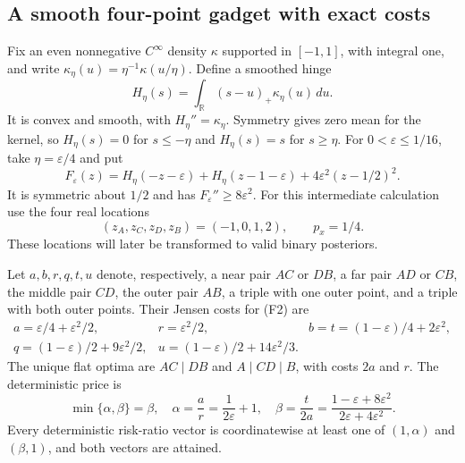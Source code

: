 \subsection{A smooth four-point gadget with exact costs}

Fix an even nonnegative $C^\infty$ density $\kappa$ supported in
$[-1,1]$, with integral one, and write
$\kappa_\eta(u)=\eta^{-1}\kappa(u/\eta)$.  Define a smoothed hinge
\[
 H_\eta(s)=\int_{\mathbb R}(s-u)_+\kappa_\eta(u)\,du.
\]
It is convex and smooth, with $H_\eta''=\kappa_\eta$.
Symmetry gives zero mean for the kernel, so
$H_\eta(s)=0$ for $s\leq-\eta$ and $H_\eta(s)=s$ for $s\geq\eta$.
For $0<\varepsilon\leq1/16$, take $\eta=\varepsilon/4$ and put
\[
 F_\varepsilon(z)
 =H_\eta(-z-\varepsilon)
  +H_\eta(z-1-\varepsilon)
  +4\varepsilon^2(z-1/2)^2.
 \tag{F2}\label{eq:hinge-gadget}
\]
It is symmetric about $1/2$ and has $F_\varepsilon''\geq8\varepsilon^2$.
For this intermediate calculation use the four real locations
\[
 (z_A,z_C,z_D,z_B)=(-1,0,1,2),\qquad p_x=1/4.
\]
These locations will later be transformed to valid binary posteriors.

\begin{lemma}
\label{lem:equal-mass-costs}
Let $a,b,r,q,t,u$ denote, respectively, a near pair $AC$ or $DB$, a
far pair $AD$ or $CB$, the middle pair $CD$, the outer pair $AB$, a
triple with one outer point, and a triple with both outer points.
Their Jensen costs for (F2) are
\[
\begin{array}{lll}
 a=\varepsilon/4+\varepsilon^2/2,&
 r=\varepsilon^2/2,&
 b=t=(1-\varepsilon)/4+2\varepsilon^2,\\[2pt]
 q=(1-\varepsilon)/2+9\varepsilon^2/2,&
 u=(1-\varepsilon)/2+14\varepsilon^2/3.&
\end{array}
\tag{F3}\label{eq:gadget-six-costs}
\]
The unique flat optima are $AC\mid DB$ and $A\mid CD\mid B$, with
costs $2a$ and $r$.  The deterministic price is
\[
 \min\{\alpha,\beta\}=\beta,
 \quad \alpha=\frac ar=\frac1{2\varepsilon}+1,\quad
 \beta=\frac t{2a}
       =\frac{1-\varepsilon+8\varepsilon^2}
              {2\varepsilon+4\varepsilon^2}.
 \tag{F4}\label{eq:gadget-price}
\]
Every deterministic risk-ratio vector is coordinatewise at least one
of $(1,\alpha)$ and $(\beta,1)$, and both vectors are attained.
\end{lemma}

